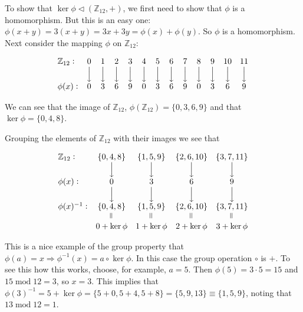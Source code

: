 \documentclass{article}
\theoremstyle{definition}
\DeclareMathOperator{\bda}{\Big \downarrow}
\newcommand{\veq}{\mathrel{\rotatebox{90}{$=$}}}
\begin{document}
\medskip
\noindent
To show that $\ker \phi \lhd (\mathbb{Z}_{12},+)$, we first need
to show that $\phi$ is a homomorphism. But this is an easy one:
$\phi(x+y) = 3 (x + y) = 3x + 3y = \phi(x) + \phi(y)$.  So $\phi$
is a homomorphism. Next consider the mapping $\phi$ on
$\mathbb{Z}_{12}$:


\begin{equation*}
\begin{array}{l c c c c c c c c c c c c}
\mathbb{Z}_{12}:  & 0    & 1    & 2    & 3    & 4    & 5    & 6    & 7    & 8    & 9    & 10   & 11 \\
                  & \bda & \bda & \bda & \bda & \bda & \bda & \bda & \bda & \bda & \bda & \bda & \bda \\
\phi(x):          & 0    & 3    & 6    & 9    & 0    & 3    & 6    & 9    & 0    & 3    & 6    & 9 \\
\end{array}
\end{equation*}

\bigskip
\noindent
We can see that the image of $\mathbb{Z}_{12}$,
$\phi(\mathbb{Z}_{12}) = \{0,3,6,9\}$ and that $\ker \phi =
\{0,4,8\}$.    

\bigskip
\noindent
Grouping the  elements of $\mathbb{Z}_{12}$ with their images we 
see that 


\medskip
\begin{equation*}
\begin{array}{l c c c c}
\mathbb{Z}_{12}: & \{0,4,8\}     & \{1,5,9\}   & \{2,6,10\}  & \{3,7,11\} \\
                 & \bda          & \bda        & \bda        & \bda \\
\phi(x):         & 0             & 3           & 6           & 9 \\
                 & \bda          & \bda        & \bda        & \bda \\
\phi(x)^{-1}:    & \{0,4,8\}     & \{1,5,9\}   & \{2,6,10\}  & \{3,7,11\} \\
                 & \veq          & \veq        & \veq        & \veq \\
                 & 0 + \ker \phi & 1+\ker \phi & 2+\ker \phi & 3+\ker \phi

\end{array}
\end{equation*}

\bigskip
\noindent
This is a nice example of the group property that $\phi(a) = x
\Rightarrow \phi^{-1}(x) = a \circ \ker \phi$. In this case the
group operation $\circ$ is $+$. To see this how this works,
choose, for example, $a = 5$. Then $\phi(5) = 3\cdot 5 = 15$ and
$15 \operatorname{mod} 12 = 3$, so $x = 3$. This implies that
$\phi(3)^{-1} = 5 + \ker \phi = \{5+0, 5+4, 5+8\} = \{5, 9, 13\}
\equiv \{1,5,9\}$, noting that $13 \operatorname{mod} 12 = 1$.
\end{document}
